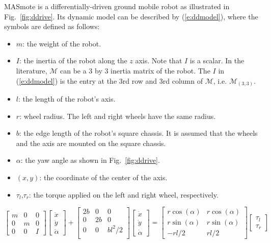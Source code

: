 MASmote \cite{ZhongminRobio04} is a differentially-driven ground mobile robot as illustrated in Fig.~\ref{fig:ddrive}. Its dynamic  model can be described by  (\ref{e:ddmodel}), where the symbols are defined as follows:
\begin{itemize}
    \item $m$: the weight of the robot.
    \item $I$: the inertia of the robot along the $z$ axis. Note that $I$ is a scalar. In the literature, $\mathcal{M}$ can be a 3 by 3 inertia matrix of the robot. The $I$ in (\ref{e:ddmodel}) is the entry at the 3rd row and 3rd column of $\mathcal{M}$, i.e. $\mathcal{M}_{(3,3)}$.
    \item $l$: the length of the robot's axis.
    \item $r$: wheel radius. The left and right wheels have the same radius.
    \item $b$: the edge length of the robot's square chassis. It is assumed that the wheels and the axis are mounted on the square chassis.
    \item $\alpha$: the yaw angle as shown in Fig.~\ref{fig:ddrive}.
    \item $(x,y)$: the coordinate of the center of the axis.
    \item $\tau_l$,$\tau_r$: the torque applied on the left and right wheel, respectively.
\end{itemize}

    \begin{equation}\label{e:ddmodel}
\begin{bmatrix}
    m   &   0   &   0 \\
    0   &   m   &   0 \\
    0   &   0   &   I
\end{bmatrix}
\begin{bmatrix}
    \ddot x\\
    \ddot y\\
    \ddot \alpha
\end{bmatrix}
+
\begin{bmatrix}
    2b  &   0   &   0 \\
    0   &   2b  &   0 \\
    0   &   0   &   bl^2/2 \\
\end{bmatrix}
\begin{bmatrix}
    \dot x \\
    \dot y \\
    \dot \alpha
\end{bmatrix}
=
\begin{bmatrix}
    r\cos(\alpha)   &   r\cos(\alpha) \\
    r\sin(\alpha)   &   r\sin(\alpha) \\
    -rl/2       &   rl/2
\end{bmatrix}
\begin{bmatrix}
    \tau_l \\
    \tau_r
\end{bmatrix}
    \end{equation}



